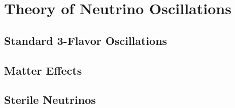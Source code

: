 \chapter{Theory of Neutrino Oscillations}

\section{Standard 3-Flavor Oscillations}

\section{Matter Effects}

\section{Sterile Neutrinos}
